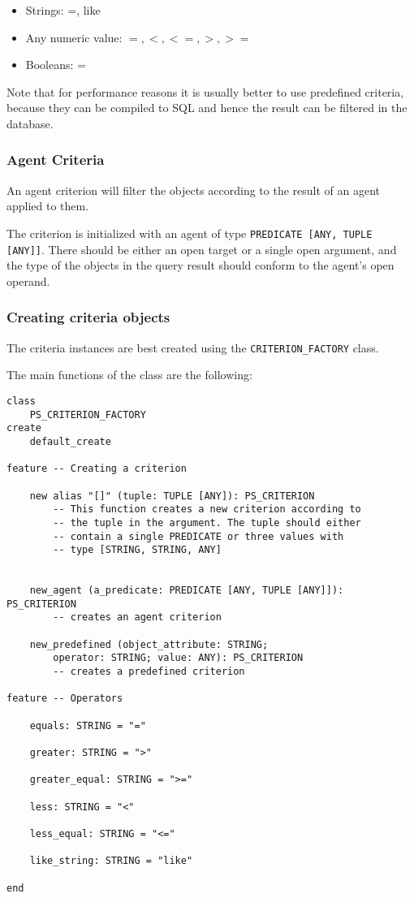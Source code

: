  \begin{itemize}
  \item Strings: =, like
  \item Any numeric value: $=, <, <=, >, >=$
  \item Booleans: =
 \end{itemize}

Note that for performance reasons it is usually better to use predefined criteria, because they can be compiled to SQL and hence the result can be filtered in the database.

\subsubsection{Agent Criteria}

An agent criterion will filter the objects according to the result of an agent applied to them.

The criterion is initialized with an agent of type \lstinline!PREDICATE [ANY, TUPLE [ANY]]!. 
There should be either an open target or a single open argument, and the type of the objects in the query result should conform to the agent's open operand.


\subsubsection{Creating criteria objects}

The criteria instances are best created using the \lstinline!CRITERION_FACTORY! class.

The main functions of the class are the following: 

\begin{lstlisting}[language=OOSC2Eiffel, captionpos=b, caption={The CRITERION\_FACTORY interface}, label={lst:factory_interface}]
class
	PS_CRITERION_FACTORY
create
	default_create

feature -- Creating a criterion

	new alias "[]" (tuple: TUPLE [ANY]): PS_CRITERION
		-- This function creates a new criterion according to 
		-- the tuple in the argument. The tuple should either 
		-- contain a single PREDICATE or three values with 
		-- type [STRING, STRING, ANY]


	new_agent (a_predicate: PREDICATE [ANY, TUPLE [ANY]]): PS_CRITERION
		-- creates an agent criterion

	new_predefined (object_attribute: STRING; 
		operator: STRING; value: ANY): PS_CRITERION
		-- creates a predefined criterion

feature -- Operators

	equals: STRING = "="

	greater: STRING = ">"

	greater_equal: STRING = ">="

	less: STRING = "<"

	less_equal: STRING = "<="

	like_string: STRING = "like"

end
\end{lstlisting}

